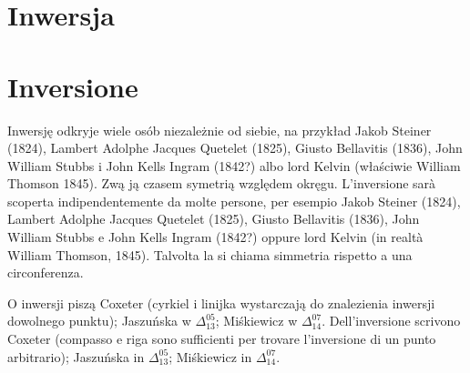 %

\section{Inwersja} %
\section{Inversione} %


Inwersję odkryje wiele osób niezależnie od siebie, na przykład Jakob Steiner (1824), Lambert Adolphe Jacques Quetelet (1825), Giusto Bellavitis (1836), John William Stubbs i John Kells Ingram (1842?) albo lord Kelvin (właściwie William Thomson 1845). %
Zwą ją czasem symetrią względem okręgu. %
L'inversione sarà scoperta indipendentemente da molte persone, per esempio Jakob Steiner (1824), Lambert Adolphe Jacques Quetelet (1825), Giusto Bellavitis (1836), John William Stubbs e John Kells Ingram (1842?) oppure lord Kelvin (in realtà William Thomson, 1845). %
Talvolta la si chiama simmetria rispetto a una circonferenza. %
%
%
%
%
%
%

O inwersji piszą %
Coxeter \cite[s. 93-101, 107-112]{coxeter_1967} (cyrkiel i linijka wystarczają do znalezienia inwersji dowolnego punktu); %
Jaszuńska w $\Delta_{13}^{05}$; %
Miśkiewicz w $\Delta_{14}^{07}$. %
Dell'inversione scrivono %
Coxeter \cite[p. 93-101, 107-112]{coxeter_1967} (compasso e riga sono sufficienti per trovare l'inversione di un punto arbitrario); %
Jaszuńska in $\Delta_{13}^{05}$; %
Miśkiewicz in $\Delta_{14}^{07}$. %
%
%


